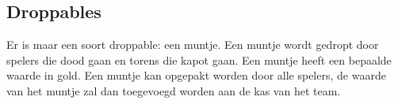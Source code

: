 \subsection{Droppables}
Er is maar een soort droppable: een muntje. Een muntje wordt gedropt door spelers die dood gaan en torens die kapot gaan. Een muntje heeft een bepaalde waarde in gold. Een muntje kan opgepakt worden door alle spelers, de waarde van het muntje zal dan toegevoegd worden aan de kas van het team.
